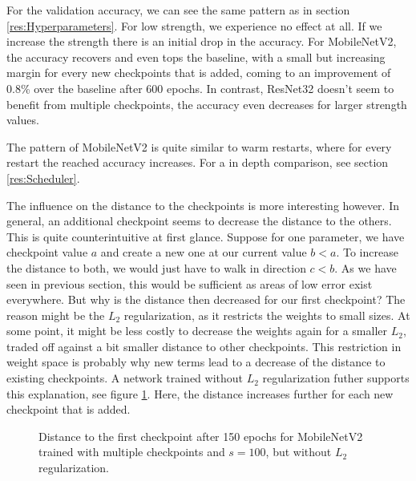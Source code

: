 For the validation accuracy, we can see the same pattern as in section
\ref{res:Hyperparameters}. For low strength, we experience no effect at all. If
we increase the strength there is an initial drop in the accuracy. For
MobileNetV2, the accuracy recovers and even tops the baseline, with a small but
increasing margin for every new checkpoints that is added, coming to an
improvement of 0.8\% over the baseline after 600 epochs. In contrast, ResNet32
doesn't seem to benefit from multiple checkpoints, the accuracy even decreases
for larger strength values.

The pattern of MobileNetV2 is quite similar to warm restarts, where for every
restart the reached accuracy increases. For a in depth comparison, see section
\ref{res:Scheduler}.

The influence on the distance to the checkpoints is more interesting however. In
general, an additional checkpoint seems to decrease the distance to the others.
This is quite counterintuitive at first glance. Suppose for one parameter, we
have checkpoint value $a$ and create a new one at our current value $b<a$. To
increase the distance to both, we would just have to walk in direction $c<b$. As
we have seen in previous section, this would be sufficient as areas of low error
exist everywhere. But why is the distance then decreased for our first
checkpoint? The reason might be the $L_2$ regularization, as it restricts the
weights to small sizes. At some point, it might be less costly to decrease the
weights again for a smaller $L_2$, traded off against a bit smaller distance to
other checkpoints. This restriction in weight space is probably why new terms
lead to a decrease of the distance to existing checkpoints. A network trained
without $L_2$ regularization futher supports this explanation, see figure \ref{fig:Noreg}. Here, the
distance increases further for each new checkpoint that is added.


\begin{figure}[h]\label{fig:Noreg}
    \begin{center}
        \caption{Distance to the first checkpoint after 150 epochs for MobileNetV2 trained with multiple checkpoints and $s=100$, but without $L_2$ regularization.}
    \end{center}
\end{figure}

